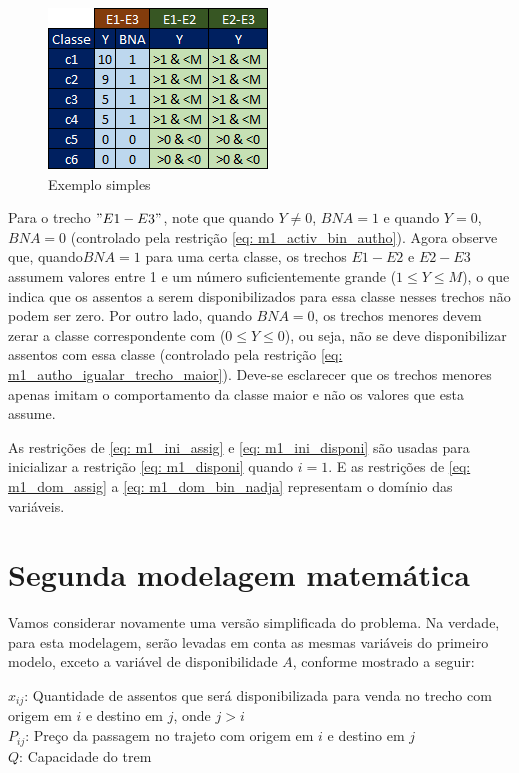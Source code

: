 \begin{figure}[!ht]
	\begin{center}
		\includegraphics[scale=0.8]{img/tab_trechos_maiores.png}
		\caption{Exemplo simples}
		\label{fig: exemplo_sip}
	\end{center}
\end{figure}

Para o trecho $"E1-E3"$, note que quando $Y \neq 0$, $BNA = 1$ e quando $Y = 0$, $BNA = 0$ (controlado pela restrição \ref{eq: m1_activ_bin_autho}). Agora observe que, quando$ BNA = 1$ para uma certa classe, os trechos $E1-E2$ e $E2-E3$ assumem valores entre 1 e um número suficientemente grande ($1 \le Y \leq M$), o que indica que os assentos a serem disponibilizados para essa classe nesses trechos não podem ser zero. Por outro lado, quando $BNA = 0$, os trechos menores devem zerar a classe correspondente com ($0 \leq Y \leq 0$), ou seja, não se deve disponibilizar assentos com essa classe (controlado pela restrição \ref{eq: m1_autho_igualar_trecho_maior}). Deve-se esclarecer que os trechos menores apenas imitam o comportamento da classe maior e não os valores que esta assume.

As restrições de \ref{eq: m1_ini_assig} e \ref{eq: m1_ini_disponi} são usadas para inicializar a restrição \ref{eq: m1_disponi} quando \(i = 1\). E as restrições de \ref{eq: m1_dom_assig} a \ref{eq: m1_dom_bin_nadja} representam o domínio das variáveis.

\section{Segunda modelagem matemática}\label{sec:modelo2}

Vamos considerar novamente uma versão simplificada do problema. Na verdade, para esta modelagem, serão levadas em conta as mesmas variáveis do primeiro modelo, exceto a variável de disponibilidade \(A\), conforme mostrado a seguir:

\noindent $x_{ij}$: Quantidade de assentos que será disponibilizada para venda no trecho com origem em $i$ e destino em $j$, onde $j>i$ \\
\noindent $P_{ij}$: Preço da passagem no trajeto com origem em $i$ e destino em $j$ \\
\noindent $Q$: Capacidade do trem


